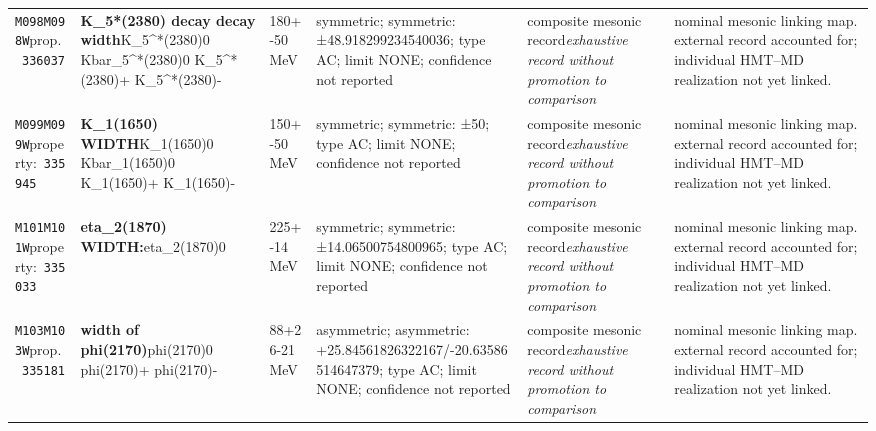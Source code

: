 \begin{landscape}
\begin{longtable}{L{1.85cm}L{4.45cm}L{2.35cm}L{4.05cm}L{3.35cm}L{7.15cm}}
\texttt{M098}\newline \texttt{M098W}\newline prop.\ \texttt{336037} & \textbf{K\_\allowbreak{}5*(2380) decay decay width}\newline K\_\allowbreak{}5\textasciicircum{}*(2380)0 \textbar{}\allowbreak{} Kbar\_\allowbreak{}5\textasciicircum{}*(2380)0 \textbar{}\allowbreak{} K\_\allowbreak{}5\textasciicircum{}*(2380)+ \textbar{}\allowbreak{} K\_\allowbreak{}5\textasciicircum{}*(2380)- & 180+-50\,MeV & symmetric; symmetric: ±48.918299234540036; type AC; limit NONE; confidence not reported & composite mesonic record\newline \emph{exhaustive record without promotion to comparison} & nominal mesonic linking map. external record accounted for; individual HMT--MD realization not yet linked. \\
\texttt{M099}\newline \texttt{M099W}\newline property:\ \texttt{335945} & \textbf{K\_\allowbreak{}1(1650) WIDTH}\newline K\_\allowbreak{}1(1650)0 \textbar{}\allowbreak{} Kbar\_\allowbreak{}1(1650)0 \textbar{}\allowbreak{} K\_\allowbreak{}1(1650)+ \textbar{}\allowbreak{} K\_\allowbreak{}1(1650)- & 150+-50\,MeV & symmetric; symmetric: ±50; type AC; limit NONE; confidence not reported & composite mesonic record\newline \emph{exhaustive record without promotion to comparison} & nominal mesonic linking map. external record accounted for; individual HMT--MD realization not yet linked. \\
\texttt{M101}\newline \texttt{M101W}\newline property:\ \texttt{335033} & \textbf{eta\_\allowbreak{}2(1870) WIDTH:}\newline eta\_\allowbreak{}2(1870)0 & 225+-14\,MeV & symmetric; symmetric: ±14.06500754800965; type AC; limit NONE; confidence not reported & composite mesonic record\newline \emph{exhaustive record without promotion to comparison} & nominal mesonic linking map. external record accounted for; individual HMT--MD realization not yet linked. \\
\texttt{M103}\newline \texttt{M103W}\newline prop.\ \texttt{335181} & \textbf{width of phi(2170)}\newline phi(2170)0 \textbar{}\allowbreak{} phi(2170)+ \textbar{}\allowbreak{} phi(2170)- & 88+26-21\,MeV & asymmetric; asymmetric: +25.84561826322167/-20.63586514647379; type AC; limit NONE; confidence not reported & composite mesonic record\newline \emph{exhaustive record without promotion to comparison} & nominal mesonic linking map. external record accounted for; individual HMT--MD realization not yet linked. \\

\end{longtable}
\end{landscape}
